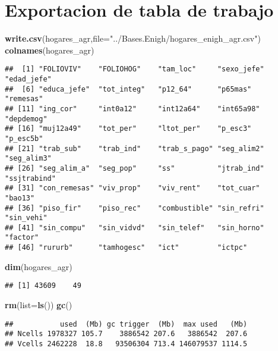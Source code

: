 \documentclass[11pt,]{article}
\newenvironment{Shaded}{\begin{snugshade}}{\end{snugshade}}
\newcommand{\KeywordTok}[1]{\textcolor[rgb]{0.13,0.29,0.53}{\textbf{#1}}}
\newcommand{\DataTypeTok}[1]{\textcolor[rgb]{0.13,0.29,0.53}{#1}}
\newcommand{\StringTok}[1]{\textcolor[rgb]{0.31,0.60,0.02}{#1}}
\newcommand{\NormalTok}[1]{#1}
\begin{document}
\section{Exportacion de tabla de
trabajo}\label{exportacion-de-tabla-de-trabajo}

\begin{Shaded}
\begin{Highlighting}[]
\KeywordTok{write.csv}\NormalTok{(hogares_agr,}\DataTypeTok{file=}\StringTok{"../Bases.Enigh/hogares_enigh_agr.csv"}\NormalTok{)}
\KeywordTok{colnames}\NormalTok{(hogares_agr)}
\end{Highlighting}
\end{Shaded}

\begin{verbatim}
##  [1] "FOLIOVIV"    "FOLIOHOG"    "tam_loc"     "sexo_jefe"   "edad_jefe"  
##  [6] "educa_jefe"  "tot_integ"   "p12_64"      "p65mas"      "remesas"    
## [11] "ing_cor"     "int0a12"     "int12a64"    "int65a98"    "depdemog"   
## [16] "muj12a49"    "tot_per"     "ltot_per"    "p_esc3"      "p_esc5b"    
## [21] "trab_sub"    "trab_ind"    "trab_s_pago" "seg_alim2"   "seg_alim3"  
## [26] "seg_alim_a"  "seg_pop"     "ss"          "jtrab_ind"   "ssjtrabind" 
## [31] "con_remesas" "viv_prop"    "viv_rent"    "tot_cuar"    "bao13"      
## [36] "piso_fir"    "piso_rec"    "combustible" "sin_refri"   "sin_vehi"   
## [41] "sin_compu"   "sin_vidvd"   "sin_telef"   "sin_horno"   "factor"     
## [46] "rururb"      "tamhogesc"   "ict"         "ictpc"
\end{verbatim}

\begin{Shaded}
\begin{Highlighting}[]
\KeywordTok{dim}\NormalTok{(hogares_agr)}
\end{Highlighting}
\end{Shaded}

\begin{verbatim}
## [1] 43609    49
\end{verbatim}

\begin{Shaded}
\begin{Highlighting}[]
\KeywordTok{rm}\NormalTok{(}\DataTypeTok{list=}\KeywordTok{ls}\NormalTok{())}
\KeywordTok{gc}\NormalTok{()}
\end{Highlighting}
\end{Shaded}

\begin{verbatim}
##           used  (Mb) gc trigger  (Mb)  max used   (Mb)
## Ncells 1978327 105.7    3886542 207.6   3886542  207.6
## Vcells 2462228  18.8   93506304 713.4 146079537 1114.5
\end{verbatim}




\newpage
\singlespacing 
\end{document}
